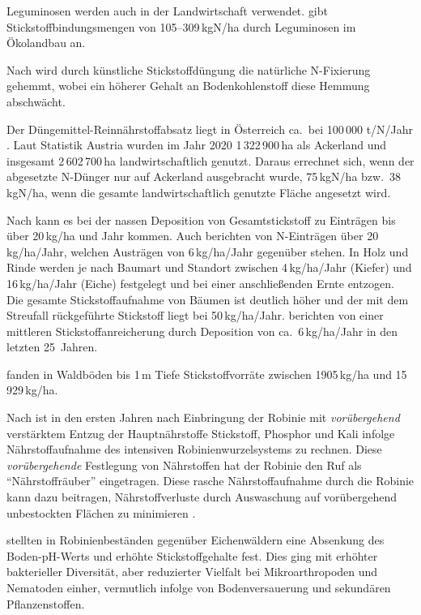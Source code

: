 \documentclass[twocolumn]{scrartcl}
\begin{document}
Leguminosen werden auch in der Landwirtschaft verwendet. \citet{kolbe2008stickstoff} gibt Stickstoffbindungsmengen von 105--309\,kgN/ha durch Leguminosen im Ökolandbau an.

Nach \citet{zheng2023nFixierung} wird durch künstliche Stickstoffdüngung die natürliche N-Fixierung gehemmt, wobei ein höherer Gehalt an Bodenkohlenstoff diese Hemmung abschwächt.

Der Düngemittel-Reinnährstoffabsatz liegt in Österreich ca.\ bei 100\,000 t/N/Jahr \citep{ama2024duengemittel}. Laut Statistik Austria wurden im Jahr 2020 1\,322\,900\,ha als Ackerland und insgesamt 2\,602\,700\,ha landwirtschaftlich genutzt. Daraus errechnet sich, wenn der abgesetzte N-Dünger nur auf Ackerland ausgebracht wurde, 75\,kgN/ha bzw.\ 38\,kgN/ha, wenn die gesamte landwirtschaftlich genutzte Fläche angesetzt wird.

Nach \citet{uba1998deposition} kann es bei der nassen Deposition von Gesamtstickstoff zu Einträgen bis über 20\,kg/ha und Jahr kommen.
Auch \citet{raspe2018stickstoff} berichten von N-Einträgen über 20\,kg/ha/Jahr, welchen Austrägen von 6\,kg/ha/Jahr gegenüber stehen. In Holz und Rinde werden je nach Baumart und Standort zwischen 4\,kg/ha/Jahr (Kiefer) und 16\,kg/ha/Jahr (Eiche) festgelegt und bei einer anschließenden Ernte entzogen. Die gesamte Stickstoffaufnahme von Bäumen ist deutlich höher und der mit dem Streufall rückgeführte Stickstoff liegt bei 50\,kg/ha/Jahr.
\citet{raspe2018stickstoff} berichten von einer mittleren Stickstoffanreicherung durch Deposition von ca.\ 6\,kg/ha/Jahr in den letzten 25~Jahren.

\citet{emberger1965stickstoff} fanden in Waldböden bis 1\,m Tiefe Stickstoffvorräte zwischen 1905\,kg/ha und 15\,929\,kg/ha.

Nach \citet{mueller1991robinie} ist in den ersten Jahren nach Einbringung der Robinie mit \emph{vorübergehend} verstärktem Entzug der Hauptnährstoffe Stickstoff, Phosphor und Kali infolge Nährstoffaufnahme des intensiven Robinienwurzelsystems zu rechnen. Diese \emph{vorübergehende} Festlegung von Nährstoffen hat der Robinie den Ruf als \enquote{Nährstoffräuber} eingetragen.
Diese rasche Nährstoffaufnahme durch die Robinie kann dazu beitragen, Nährstoffverluste durch Auswaschung auf vorübergehend unbestockten Flächen zu minimieren \citep{boring1984robinie}.

\citet{lazzaro2018robinie} stellten in Robinienbeständen gegenüber Eichenwäldern eine Absenkung des Boden-pH-Werts und erhöhte Stickstoffgehalte fest. Dies ging mit erhöhter bakterieller Diversität, aber reduzierter Vielfalt bei Mikroarthropoden und Nematoden einher, vermutlich infolge von Bodenversauerung und sekundären Pflanzenstoffen.
\end{document}
